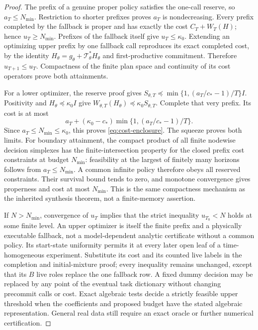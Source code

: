 \begin{proof}
The prefix of a genuine proper policy satisfies the one-call reserve, so $a_T\le N_{\min}$. Restriction to shorter prefixes proves $a_T$ is nondecreasing. Every prefix completed by the fallback is proper and has exactly the cost $C_T+W_T(H)$; hence $u_T\ge N_{\min}$. Prefixes of the fallback itself give $u_T\le \kappa_0$. Extending an optimizing upper prefix by one fallback call reproduces its exact completed cost, by the identity $H_\theta=g_\theta+\mathcal T_\theta^*H_\theta$ and first-productive commitment. Therefore $u_{T+1}\le u_T$. Compactness of the finite plan space and continuity of its cost operators prove both attainments.

For a lower optimizer, the reserve proof gives
$S_{\theta,T}\preccurlyeq\min\{1,(a_T/c_*-1)/T\}I$. Positivity and $H_\theta\preccurlyeq \kappa_0I$ give $W_{\theta,T}(H_\theta)\preccurlyeq \kappa_0S_{\theta,T}$. Complete that very prefix. Its cost is at most
\[
 a_T+(\kappa_0-c_*)\min\{1,(a_T/c_*-1)/T\}.
\]
Since $a_T\le N_{\min}\le \kappa_0$, this proves \eqref{eq:cost-enclosure}. The squeeze proves both limits. For boundary attainment, the compact product of all finite nodewise decision simplexes has the finite-intersection property for the closed prefix cost constraints at budget $N_{\min}$: feasibility at the largest of finitely many horizons follows from $a_T\le N_{\min}$. A common infinite policy therefore obeys all reserved constraints. Their survival bound tends to zero, and monotone convergence gives properness and cost at most $N_{\min}$. This is the same compactness mechanism as the inherited synthesis theorem, not a finite-memory assertion.

If $N>N_{\min}$, convergence of $u_T$ implies that the strict inequality $u_{T_0}<N$ holds at some finite level. An upper optimizer is itself the finite prefix and a physically executable fallback, not a model-dependent analytic certificate without a common policy. Its start-state uniformity permits it at every later open leaf of a time-homogeneous experiment. Substitute its cost and its counted live labels in the completion and initial-mixture proof; every inequality remains unchanged, except that its $B$ live roles replace the one fallback row. A fixed dummy decision may be replaced by any point of the eventual task dictionary without changing precommit calls or cost. Exact algebraic tests decide a strictly feasible upper threshold when the coefficients and proposed budget have the stated algebraic representation. General real data still require an exact oracle or further numerical certification.
\end{proof}

